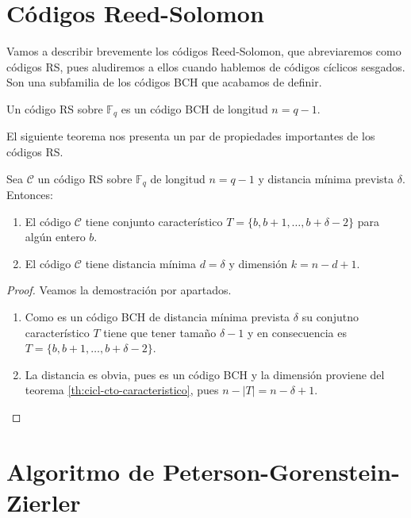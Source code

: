 \section{Códigos Reed-Solomon}

Vamos a describir brevemente los códigos Reed-Solomon, que abreviaremos como códigos RS, pues aludiremos a ellos cuando hablemos de códigos cíclicos sesgados.
Son una subfamilia de los códigos BCH que acabamos de definir.

\begin{definition}
  Un código RS sobre \(\mathbb F_q\) es un código BCH de longitud \(n = q - 1\).
\end{definition}

El siguiente teorema nos presenta un par de propiedades importantes de los códigos RS.

\begin{theorem}
  Sea \(\mathcal C\) un código RS sobre \(\mathbb F_q\) de longitud \(n = q - 1\) y distancia mínima prevista \(\delta\).
  Entonces:
  \begin{enumerate}
    \item El código \(\mathcal C\) tiene conjunto característico \(T = \{b, b + 1, \dots, b + \delta - 2\}\) para algún entero \(b\).
    \item El código \(\mathcal C\) tiene distancia mínima \(d = \delta\) y dimensión \(k = n - d + 1\).
  \end{enumerate}
\end{theorem}

\begin{proof}
  Veamos la demostración por apartados.
  \begin{enumerate}
    \item Como es un código BCH de distancia mínima prevista \(\delta\) su conjutno característico \(T\) tiene que tener tamaño \(\delta - 1\) y en consecuencia es \(T = \{b, b + 1, \dots, b + \delta - 2\}\).
    \item La distancia es obvia, pues es un código BCH y la dimensión proviene del teorema \ref{th:cicl-cto-caracteristico}, pues \(n - |T| = n - \delta + 1\).
  \end{enumerate}
\end{proof}


\section{Algoritmo de Peterson-Gorenstein-Zierler}

